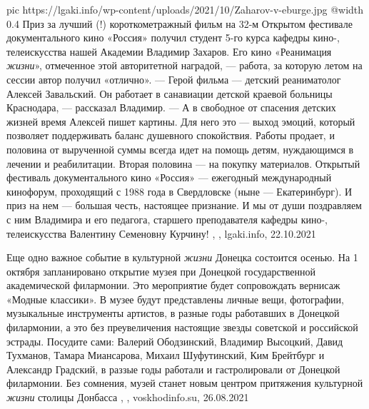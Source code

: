\ifcmt
  pic https://lgaki.info/wp-content/uploads/2021/10/Zaharov-v-eburge.jpg
  @width 0.4
\fi
Приз за лучший (!) короткометражный фильм на 32-м Открытом фестивале
документального кино «Россия» получил студент 5-го курса кафедры кино-,
телеискусства нашей Академии Владимир Захаров. Его кино «Реанимация
\emph{жизни}», отмеченное этой авторитетной наградой, — работа, за которую
летом на сессии автор получил «отлично».  — Герой фильма — детский реаниматолог
Алексей Завальский. Он работает в санавиации детской краевой больницы
Краснодара, — рассказал Владимир. — А в свободное от спасения детских жизней
время Алексей пишет картины. Для него это — выход эмоций, который позволяет
поддерживать баланс душевного спокойствия. Работы продает, и половина от
вырученной суммы всегда идет на помощь детям, нуждающимся в лечении и
реабилитации. Вторая половина — на покупку материалов.  Открытый фестиваль
документального кино «Россия» — ежегодный международный кинофорум, проходящий с
1988 года в Свердловске (ныне — Екатеринбург). И приз на нем — большая честь,
настоящее признание. И мы от души поздравляем с ним Владимира и его педагога,
старшего преподавателя кафедры кино-, телеискусства Валентину Семеновну
Курчину!
, , lgaki.info, 22.10.2021

Еще одно важное событие в культурной \emph{жизни} Донецка состоится осенью. На
1 октября запланировано открытие музея при Донецкой государственной
академической филармонии. Это мероприятие будет сопровождать вернисаж «Модные
классики».  В музее будут представлены личные вещи, фотографии, музыкальные
инструменты артистов, в разные годы работавших в Донецкой филармонии, а это без
преувеличения настоящие звезды советской и российской эстрады. Посудите сами:
Валерий Ободзинский, Владимир Высоцкий, Давид Тухманов, Тамара Миансарова,
Михаил Шуфутинский, Ким Брейтбург и Александр Градский, в раззые годы работали
и гастролировали от Донецкой филармонии.  Без сомнения, музей станет новым
центром притяжения культурной \emph{жизни} столицы Донбасса
, , voskhodinfo.su, 26.08.2021
